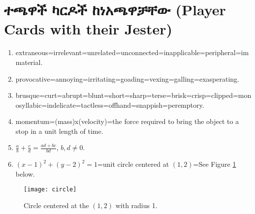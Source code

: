 \documentclass[a4paper,12pt]{article}
\newenvironment{geez}{\geezfont}{}
\theoremstyle{mystyle}
\numberwithin{equation}{section}
\numberwithin{theorem}{section}
\numberwithin{proposition}{section}
\numberwithin{example}{section}
\numberwithin{remark}{section}
\numberwithin{lemma}{section}
\numberwithin{corollary}{section}
\numberwithin{definition}{section}
\numberwithin{amharicdefinition}{section}
\begin{document}
\section{\begin{geez}ተጫዋች ካርዶች ከነአጫዋቻቸው (Player Cards with their Jester)\end{geez}}
\label{S:3}
\begin{enumerate}
\item extraneous=irrelevant=unrelated=unconnected=inapplicable=peripheral=immaterial.
\item provocative=annoying=irritating=goading=vexing=galling=exasperating.
\item brusque=curt=abrupt=blunt=short=sharp=terse=brisk=crisp=clipped=monosyllabic=indelicate=tactless=offhand=snappish=peremptory.
\item momentum=(mass)x(velocity)=the force required to bring the object to a stop in a unit length of time.
\item $\frac{a}{b}+\frac{c}{d}=\frac{ad+bc}{bd}$, $b,d\ne 0$.
\item $(x-1)^2+(y-2)^2=1$=unit circle centered at $(1,2)$=See Figure \ref{figure1} below.
\end{enumerate}
\begin{figure}[h!]
\begin{center}
\texttt{[image: circle]}
\end{center}
\caption{Circle centered at the $(1,2)$ with radius 1.}
\label{figure1}
\end{figure}
\printbibliography
\end{document}
